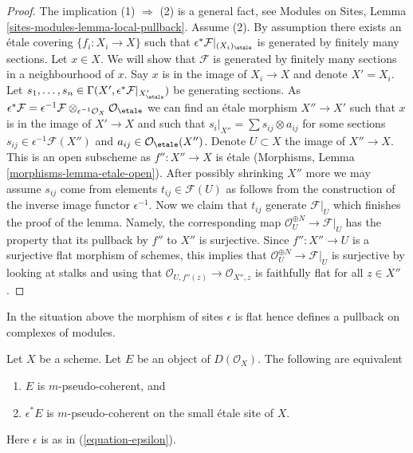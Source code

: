 \begin{proof}
The implication (1) $\Rightarrow$ (2) is a general fact, see
Modules on Sites, Lemma \ref{sites-modules-lemma-local-pullback}.
Assume (2). By assumption there exists an \'etale covering
$\{f_i : X_i \to X\}$ such that
$\epsilon^*\mathcal{F}|_{(X_i)_\etale}$ is generated by
finitely many sections. Let $x \in X$. We will show that $\mathcal{F}$
is generated by finitely many sections in a neighbourhood of $x$.
Say $x$ is in the image of $X_i \to X$ and denote $X' = X_i$. Let
$s_1, \ldots, s_n \in
\Gamma(X', \epsilon^*\mathcal{F}|_{X'_\etale})$
be generating sections. As
$\epsilon^*\mathcal{F} =
\epsilon^{-1}\mathcal{F} \otimes_{\epsilon^{-1}\mathcal{O}_X}
\mathcal{O}_\etale$
we can find an \'etale morphism $X'' \to X'$ such that $x$ is
in the image of $X' \to X$ and such that
$s_i|_{X''} = \sum s_{ij} \otimes a_{ij}$ for some sections
$s_{ij} \in \epsilon^{-1}\mathcal{F}(X'')$ and
$a_{ij} \in \mathcal{O}_\etale(X'')$. Denote $U \subset X$ the image
of $X'' \to X$. This is an open subscheme as $f'' : X'' \to X$ is \'etale
(Morphisms, Lemma \ref{morphisms-lemma-etale-open}). After possibly
shrinking $X''$ more we may assume $s_{ij}$ come from elements
$t_{ij} \in \mathcal{F}(U)$ as follows from the construction of
the inverse image functor $\epsilon^{-1}$. Now we claim that
$t_{ij}$ generate $\mathcal{F}|_U$ which finishes the proof
of the lemma. Namely, the corresponding map
$\mathcal{O}_U^{\oplus N} \to \mathcal{F}|_U$ has the property
that its pullback by $f''$ to $X''$ is surjective. Since $f'' : X'' \to U$
is a surjective flat morphism of schemes, this implies that
$\mathcal{O}_U^{\oplus N} \to \mathcal{F}|_U$ is surjective by
looking at stalks and using that
$\mathcal{O}_{U, f''(z)} \to \mathcal{O}_{X'', z}$
is faithfully flat for all $z \in X''$.
\end{proof}

\noindent
In the situation above the morphism of sites $\epsilon$ is flat
hence defines a pullback on complexes of modules.

\begin{lemma}
\label{lemma-descend-pseudo-coherent}
Let $X$ be a scheme. Let $E$ be an object of $D(\mathcal{O}_X)$.
The following are equivalent
\begin{enumerate}
\item $E$ is $m$-pseudo-coherent, and
\item $\epsilon^*E$ is $m$-pseudo-coherent on the small \'etale site of $X$.
\end{enumerate}
Here $\epsilon$ is as in (\ref{equation-epsilon}).
\end{lemma}

